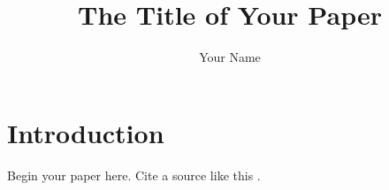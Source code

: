 \documentclass[stu,12pt,floatsintext]{apa7}
\title{The Title of Your Paper}
\author{Your Name}
\affiliation{Your Institution}
\begin{document}
\maketitle

\section{Introduction}

Begin your paper here. Cite a source like this \parencite{sample}.

\printbibliography
\end{document}
